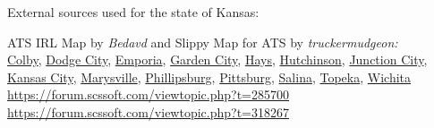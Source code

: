 
















\vspace{2em}\footnoterule
{\footnotesize \noindent External sources used for the state of Kansas:
\begin{description}[
style=nextline,
leftmargin=1.1em,
labelsep=0pt,
parsep=0pt,
font=\normalfont,
]

\item[$\ast$]
ATS IRL Map by \textit{Bedavd} and Slippy Map for ATS by \textit{truckermudgeon:}\\
\hyperref[city:Colby]{Colby},
\hyperref[city:Dodge City]{Dodge City},
\hyperref[city:Emporia]{Emporia},
\hyperref[city:Garden City]{Garden City},
\hyperref[city:Hays]{Hays},
\hyperref[city:Hutchinson]{Hutchinson},
\hyperref[city:Junction City]{Junction City},
\hyperref[city:kansas_ci_ks]{Kansas City},
\hyperref[city:Marysville]{Marysville},
\hyperref[city:Phillipsburg]{Phillipsburg},
\hyperref[city:Pittsburg]{Pittsburg},
\hyperref[city:salina_ks]{Salina},
\hyperref[city:Topeka]{Topeka},
\hyperref[city:Wichita]{Wichita}
\\ \url{https://forum.scssoft.com/viewtopic.php?t=285700}
\\ \url{https://forum.scssoft.com/viewtopic.php?t=318267}

\end{description}
}
